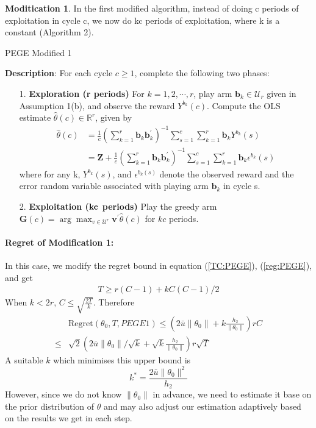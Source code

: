 \documentclass{article}
\theoremstyle{plain}
\theoremstyle{definition}
\newtheorem{modification}{Moditication}
\begin{document}
\begin{modification}
In the first modified algorithm, instead of doing c periods of exploitation in cycle c, we now do kc periods of exploitation, where k is a constant (Algorithm 2).
\begin{algorithm}\label{alg:PEGE1}
\caption{PEGE Modified 1}
\textbf{Description}: For each cycle $c\geq 1$, complete the following two phases:
\begin{itemize}
\item [1. ] \textbf{Exploration (r periods)} For $k=1,2,\cdots,r$, play arm $\textbf{b}_{k}\in \mathcal{U}_{r}$ given in Assumption 1(b), and observe the reward $Y^{b_{k}}(c)$. Compute the OLS estimate $\hat{\theta}(c)\in \mathbb{R}^{r}$, given by
\begin{align}
\hat{\theta}(c)&=\frac{1}{c}(\sum_{k=1}^{r}\textbf{b}_{k}\textbf{b}_{k}^{'})^{-1}\sum_{s=1}^{c}\sum_{k=1}^{r}\textbf{b}_{k}Y^{b_{k}}(s) \nonumber \\
&=\textbf{Z}+\frac{1}{c}(\sum_{k=1}^{r}\textbf{b}_{k}\textbf{b}_{k}^{'})^{-1}\sum_{s=1}^{c}\sum_{k=1}^{r}\textbf{b}_{k}\epsilon^{b_{k}}(s) \nonumber 
\end{align}
where for any k, $Y^{b_{k}}(s)$, and $\epsilon^{b_{k}(s)}$ denote the observed reward and the error random variable associated with playing arm $\textbf{b}_{k}$ in cycle s.
\item [2. ] \textbf{Exploitation ($\bold{kc}$ periods)} Play the greedy arm $\textbf{G}(c)=\arg \max_{v\in \mathcal{U}^{r}}\textbf{v}^{'}\hat{\theta}(c)$ for $kc$ periods.
\end{itemize}
\end{algorithm}
\paragraph{Regret of Modification 1:}
In this case, we modify the regret bound in equation (\ref{TC:PEGE}), (\ref{reg:PEGE}), and get
\begin{align}
T \geq r(C-1)+k{C(C-1)}/{2}
\end{align}
When $k<2r$, $C\leq\sqrt{\frac{2T}{k}}$. Therefore
\begin{align}
& \text{Regret}(\theta_0, T, PEGE1)\leq (2\bar{u}\|\theta_0\|+k\frac{h_2}{\|\theta_0\|})rC \nonumber\\
\leq & \sqrt{2}(2\bar{u}\|\theta_0\|/\sqrt{k}+\sqrt{k}\frac{h_2}{\|\theta_0\|})r\sqrt{T}
\end{align}
A suitable $k$ which minimises this upper bound is
\[k^*=\frac{2\bar{u}\|\theta_0\|^2}{h_2}\]
However, since we do not know $\|\theta_0\|$ in advance, we need to estimate it base on the prior distribution of $\theta$ and may also adjust our estimation adaptively based on the results we get in each step.
\end{modification}
\end{document}

